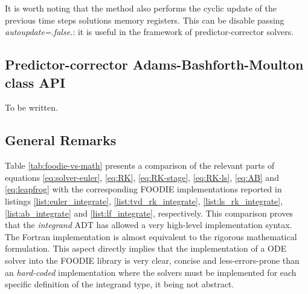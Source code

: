 It is worth noting that the method also performs the cyclic update of the previous time steps solutions memory registers. This can be disable passing \emph{autoupdate=.false.}: it is useful in the framework of predictor-corrector solvers.

\subsection{Predictor-corrector Adams-Bashforth-Moulton class API}\label{subsec:solver_abm}

{\color{red} To be written.}

\subsection{General Remarks}\label{subsec:API-remarks}

Table \ref{tab:foodie-vs-math} presents a comparison of the relevant parts of equations \ref{eq:solver-euler}, \ref{eq:RK}, \ref{eq:RK-stage}, \ref{eq:RK-ls}, \ref{eq:AB} and \ref{eq:leapfrog} with the corresponding FOODIE implementations reported in listings \ref{list:euler_integrate}, \ref{list:tvd_rk_integrate}, \ref{list:ls_rk_integrate}, \ref{list:ab_integrate} and \ref{list:lf_integrate}, respectively. This comparison proves that the \emph{integrand} ADT has allowed a very high-level implementation syntax. The Fortran implementation is almost equivalent to the rigorous mathematical formulation. This aspect directly implies that the implementation of a ODE solver into the FOODIE library is very clear, concise and less-errors-prone than an \emph{hard-coded} implementation where the solvers must be implemented for each specific definition of the integrand type, it being not abstract.


